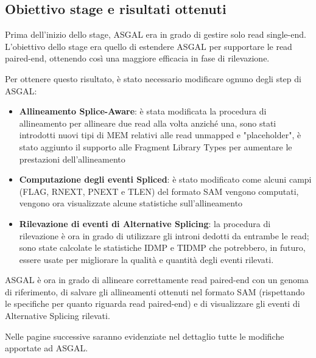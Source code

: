 \subsection{Obiettivo stage e risultati ottenuti}
Prima dell'inizio dello stage, ASGAL era in grado di gestire solo read single-end. L'obiettivo dello stage era quello di estendere ASGAL per supportare le read paired-end, ottenendo così una maggiore efficacia in fase di rilevazione.

Per ottenere questo risultato, è stato necessario modificare ognuno degli step di ASGAL:
\begin{itemize}
	\item \textbf{Allineamento Splice-Aware}: è stata modificata la procedura di allineamento per allineare due read alla volta anziché una, sono stati introdotti nuovi tipi di MEM relativi alle read unmapped e "placeholder", è stato aggiunto il supporto alle Fragment Library Types per aumentare le prestazioni dell'allineamento
	\item \textbf{Computazione degli eventi Spliced}: è stato modificato come alcuni campi (FLAG, RNEXT, PNEXT e TLEN) del formato SAM vengono computati, vengono ora visualizzate alcune statistiche sull'allineamento
	\item \textbf{Rilevazione di eventi di Alternative Splicing}: la procedura di rilevazione è ora in grado di utilizzare gli introni dedotti da entrambe le read; sono state calcolate le statistiche IDMP e TIDMP che potrebbero, in futuro, essere usate per migliorare la qualità e quantità degli eventi rilevati.
\end{itemize}

ASGAL è ora in grado di allineare correttamente read paired-end con un genoma di riferimento, di salvare gli allineamenti ottenuti nel formato SAM (rispettando le specifiche per quanto riguarda read paired-end) e di visualizzare gli eventi di Alternative Splicing rilevati. 

Nelle pagine successive saranno evidenziate nel dettaglio tutte le modifiche apportate ad ASGAL.